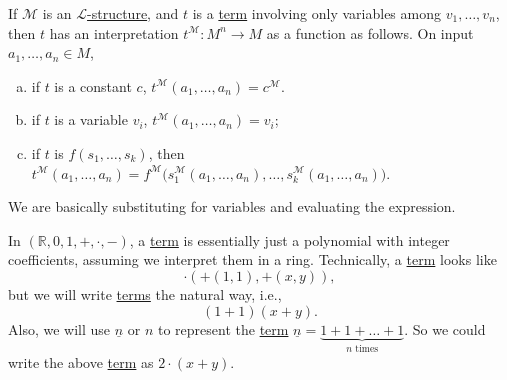 If \(\mathcal{M}\) is an \hyperref[def:structure]{\(\mathcal{L} \)-structure}, and \(t\) is a \hyperref[def:term]{term} involving only variables among \(v_1, \ldots , v_n\), then \(t\) has an interpretation \(t^{\mathcal{M}} \colon M^n \to M\) as a function as follows. On input \(a_1, \ldots , a_n \in M\),
\begin{enumerate}[(a)]
	\item if \(t\) is a constant \(c\), \(t^{\mathcal{M} } (a_1, \ldots , a_n) = c^{\mathcal{M} }\).
	\item if \(t\) is a variable \(v_i\), \(t^{\mathcal{M} } (a_1, \ldots , a_n) = v_i\);
	\item if \(t\) is \(f(s_1, \ldots , s_k)\), then \(t^{\mathcal{M} } (a_1, \ldots , a_n) = f^{\mathcal{M} } \big(s_1^{\mathcal{M} }(a_1, \ldots , a_n), \ldots , s_k^{\mathcal{M}}(a_1, \ldots , a_n) \big)\).
\end{enumerate}

\begin{intuition}
	We are basically substituting for variables and evaluating the expression.
\end{intuition}

\begin{eg}
	In \((\mathbb{R} , 0, 1, +, \cdot, -)\), a \hyperref[def:term]{term} is essentially just a polynomial with integer coefficients, assuming we interpret them in a ring. Technically, a \hyperref[def:term]{term} looks like
	\[
		\cdot(+(1, 1), +(x, y)),
	\]
	but we will write \hyperref[def:term]{terms} the natural way, i.e.,
	\[
		(1+1) (x+y).
	\]
	Also, we will use \(\underline{n}\) or \(n\) to represent the \hyperref[def:term]{term} \(\underline{n} = \underbrace{1+1+\ldots +1}_{n\text{ times}}\). So we could write the above \hyperref[def:term]{term} as \(2\cdot(x+y)\).
\end{eg}

